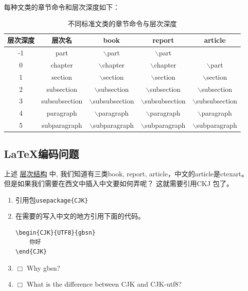 \documentclass[UTF8]{ctexart}
\begin{document}
每种文类的章节命令和层次深度如下：


\begin{table}[htbp]
    \centering
    \begin{tabular}{|c|c|c|c|c|}
        \hline
        层次深度 & 层次名        & book                      & report                    & article                   \\
        \hline
        -1       & part          & $\backslash$part          & $\backslash$part          &                           \\
        0        & chapter       & $\backslash$chapter       & $\backslash$chapter       & $\backslash$part          \\
        1        & section       & $\backslash$section       & $\backslash$section       & $\backslash$section       \\
        2        & subsection    & $\backslash$subsection    & $\backslash$subsection    & $\backslash$subsection    \\
        3        & subsubsection & $\backslash$subsubsection & $\backslash$subsubsection & $\backslash$subsubsection \\
        4        & paragraph     & $\backslash$paragraph     & $\backslash$paragraph     & $\backslash$paragraph     \\
        5        & subparagraph  & $\backslash$subparagraph  & $\backslash$subparagraph  & $\backslash$subparagraph  \\
        \hline
    \end{tabular}
    \caption{不同标准文类的章节命令与层次深度}
    \label{tab:typeoflatex}
\end{table}

\subsection{\LaTeX 编码问题}
上述 \hyperlink{Levelofdepth}{层次结构} 中, 我们知道有三类book, report, article，中文的article是ctexart。
但是如果我们需要在西文中插入中文要如何弄呢？
这就需要引用CKJ 包了。

\begin{enumerate}
    \item \Checkmark 引用包\verb!usepackage{CJK}!
    \item \Checkmark 在需要的写入中文的地方引用下面的代码。

          \begin{lstlisting}
\begin{CJK}{UTF8}{gbsn}
    你好
\end{CJK}        
        \end{lstlisting}
    \item $\Box$ Why gbsn?
    \item $\Box$ What is the difference between CJK and CJK-utf8?
\end{enumerate}
\end{document}
